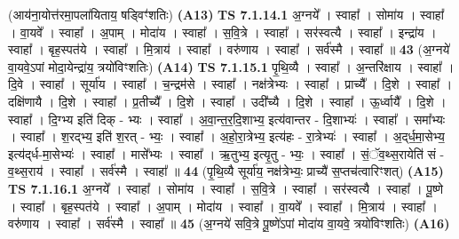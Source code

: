 \documentclass[17pt]{extarticle}
\begin{document}
                  \newline
                      (आय॑ना॒योत्त॑रमा॒पला॑यिताय॒ षड्विꣳ॑शतिः)  \textbf{(A13)} \newline \newline
                                \textbf{ TS 7.1.14.1} \newline
                  अ॒ग्नये᳚ । स्वाहा᳚ । सोमा॑य । स्वाहा᳚ । वा॒यवे᳚ । स्वाहा᳚ । अ॒पाम् । मोदा॑य । स्वाहा᳚ । स॒वि॒त्रे । स्वाहा᳚ । सर॑स्वत्यै । स्वाहा᳚ । इन्द्रा॑य । स्वाहा᳚ । बृह॒स्पत॑ये । स्वाहा᳚ । मि॒त्राय॑ । स्वाहा᳚ । वरु॑णाय । स्वाहा᳚ । सर्व॑स्मै । स्वाहा᳚ ॥ \textbf{  43} \newline
                  \newline
                      (अ॒ग्नये॑ वा॒यवे॒ऽपां मोदा॒येन्द्रा॑य॒ त्रयो॑विꣳशतिः)  \textbf{(A14)} \newline \newline
                                \textbf{ TS 7.1.15.1} \newline
                  पृ॒थि॒व्यै । स्वाहा᳚ । अ॒न्तरि॑क्षाय । स्वाहा᳚ । दि॒वे । स्वाहा᳚ । सूर्या॑य । स्वाहा᳚ । च॒न्द्रम॑से । स्वाहा᳚ । नक्ष॑त्रेभ्यः । स्वाहा᳚ । प्राच्यै᳚ । दि॒शे । स्वाहा᳚ । दक्षि॑णायै । दि॒शे । स्वाहा᳚ । प्र॒तीच्यै᳚ । दि॒शे । स्वाहा᳚ । उदी᳚च्यै । दि॒शे । स्वाहा᳚ । ऊ॒र्ध्वायै᳚ । दि॒शे । स्वाहा᳚ । दि॒ग्भ्य इति॑ दिक् - भ्यः । स्वाहा᳚ । अ॒वा॒न्त॒र॒दि॒शाभ्य॒ इत्य॑वान्तर - दि॒शाभ्यः॑ । स्वाहा᳚ । समा᳚भ्यः । स्वाहा᳚ । श॒रद्भ्य॒ इति॑ श॒रत् - भ्यः॒ । स्वाहा᳚ । अ॒हो॒रा॒त्रेभ्य॒ इत्य॑हः - रा॒त्रेभ्यः॑ । स्वाहा᳚ । अ॒द्‌र्ध॒मा॒सेभ्य॒ इत्य॑द्‌र्ध-मा॒सेभ्यः॑ । स्वाहा᳚ । मासे᳚भ्यः । स्वाहा᳚ । ऋ॒तुभ्य॒ इत्यृ॒तु - भ्यः॒ । स्वाहा᳚ । सं॒ॅव॒थ्स॒रायेति॑ सं - व॒थ्स॒राय॑ । स्वाहा᳚ । सर्व॑स्मै । स्वाहा᳚ ॥ \textbf{  44} \newline
                  \newline
                      (पृ॒थि॒व्यै सूर्या॑य॒ नक्ष॑त्रेभ्यः॒ प्राच्यै॑ स॒प्तच॑त्वारिꣳशत्)  \textbf{(A15)} \newline \newline
                                \textbf{ TS 7.1.16.1} \newline
                  अ॒ग्नये᳚ । स्वाहा᳚ । सोमा॑य । स्वाहा᳚ । स॒वि॒त्रे । स्वाहा᳚ । सर॑स्वत्यै । स्वाहा᳚ । पू॒ष्णे । स्वाहा᳚ । बृह॒स्पत॑ये । स्वाहा᳚ । अ॒पाम् । मोदा॑य । स्वाहा᳚ । वा॒यवे᳚ । स्वाहा᳚ । मि॒त्राय॑ । स्वाहा᳚ । वरु॑णाय । स्वाहा᳚ । सर्व॑स्मै । स्वाहा᳚ ॥ \textbf{  45} \newline
                  \newline
                      (अ॒ग्नये॑ सवि॒त्रे पू॒ष्णे॑ऽपां मोदा॑य वा॒यवे॒ त्रयो॑विꣳशतिः)  \textbf{(A16)} \newline \newline
\end{document}
